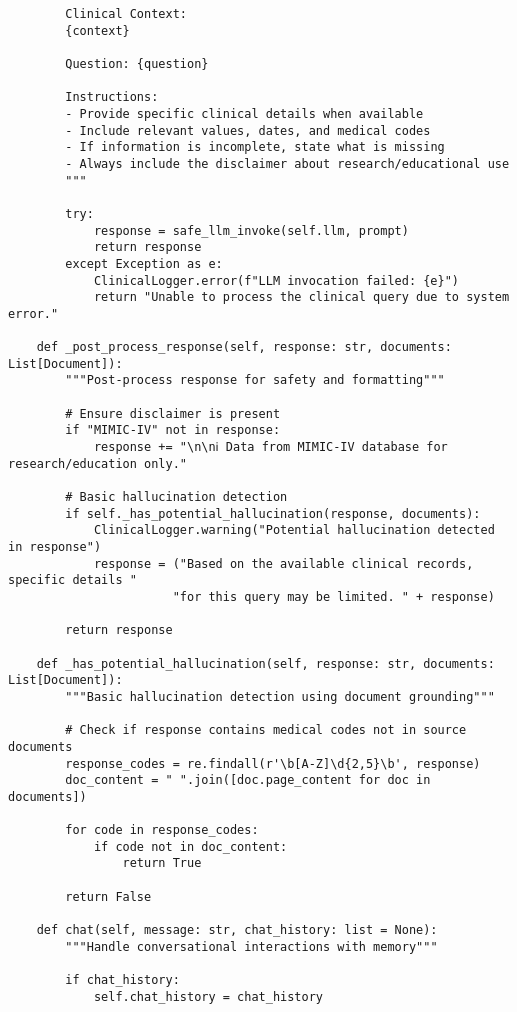 \begin{verbatim}
        Clinical Context:
        {context}
        
        Question: {question}
        
        Instructions:
        - Provide specific clinical details when available
        - Include relevant values, dates, and medical codes
        - If information is incomplete, state what is missing
        - Always include the disclaimer about research/educational use
        """
        
        try:
            response = safe_llm_invoke(self.llm, prompt)
            return response
        except Exception as e:
            ClinicalLogger.error(f"LLM invocation failed: {e}")
            return "Unable to process the clinical query due to system error."
    
    def _post_process_response(self, response: str, documents: List[Document]):
        """Post-process response for safety and formatting"""
        
        # Ensure disclaimer is present
        if "MIMIC-IV" not in response:
            response += "\n\nℹ️ Data from MIMIC-IV database for research/education only."
        
        # Basic hallucination detection
        if self._has_potential_hallucination(response, documents):
            ClinicalLogger.warning("Potential hallucination detected in response")
            response = ("Based on the available clinical records, specific details "
                       "for this query may be limited. " + response)
        
        return response
    
    def _has_potential_hallucination(self, response: str, documents: List[Document]):
        """Basic hallucination detection using document grounding"""
        
        # Check if response contains medical codes not in source documents
        response_codes = re.findall(r'\b[A-Z]\d{2,5}\b', response)
        doc_content = " ".join([doc.page_content for doc in documents])
        
        for code in response_codes:
            if code not in doc_content:
                return True
        
        return False

    def chat(self, message: str, chat_history: list = None):
        """Handle conversational interactions with memory"""
        
        if chat_history:
            self.chat_history = chat_history
        

\end{verbatim}
